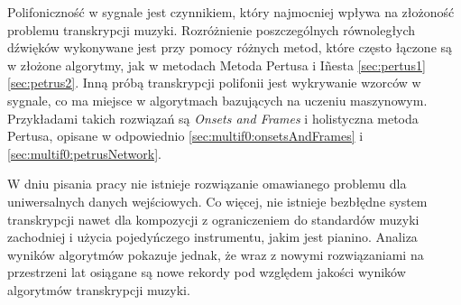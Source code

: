 \documentclass[12pt,a4paper,twoside]{mwart}
\begin{document}
Polifoniczność w sygnale jest czynnikiem, który najmocniej wpływa na złożoność problemu transkrypcji muzyki. Rozróżnienie poszczególnych równoległych dźwięków wykonywane jest przy pomocy różnych metod, które często łączone są w złożone algorytmy, jak w metodach Metoda Pertusa i Iñesta \ref{sec:pertus1} \ref{sec:petrus2}. Inną próbą transkrypcji polifonii jest wykrywanie wzorców w sygnale, co ma miejsce w algorytmach bazujących na uczeniu maszynowym. Przykładami takich rozwiązań są \textit{Onsets and Frames} i holistyczna metoda Pertusa, opisane w odpowiednio \ref{sec:multif0:onsetsAndFrames} i \ref{sec:multif0:petrusNetwork}.

W dniu pisania pracy nie istnieje rozwiązanie omawianego problemu dla uniwersalnych danych wejściowych. Co więcej, nie istnieje bezbłędne system transkrypcji nawet dla kompozycji z ograniczeniem do standardów muzyki zachodniej i użycia pojedyńczego instrumentu, jakim jest pianino. Analiza wyników algorytmów pokazuje jednak, że wraz z nowymi rozwiązaniami na przestrzeni lat osiągane są nowe rekordy pod względem jakości wyników algorytmów transkrypcji muzyki. 


\end{document}
